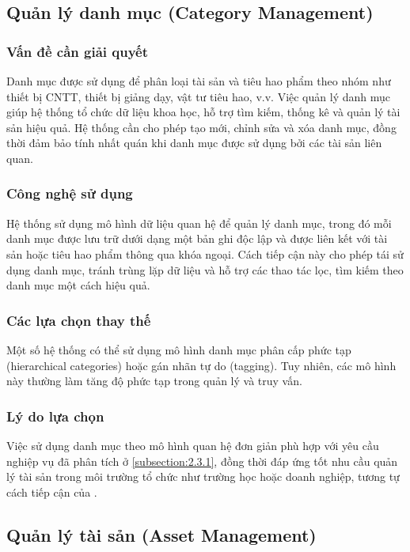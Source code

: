 \documentclass[../DoAn.tex]{subfiles}
\begin{document}
\subsection{Quản lý danh mục (Category Management)}

\subsubsection{Vấn đề cần giải quyết}

Danh mục được sử dụng để phân loại tài sản và tiêu hao phẩm theo nhóm như thiết bị CNTT, thiết bị giảng dạy, vật tư tiêu hao, v.v. Việc quản lý danh mục giúp hệ thống tổ chức dữ liệu khoa học, hỗ trợ tìm kiếm, thống kê và quản lý tài sản hiệu quả. Hệ thống cần cho phép tạo mới, chỉnh sửa và xóa danh mục, đồng thời đảm bảo tính nhất quán khi danh mục được sử dụng bởi các tài sản liên quan.

\subsubsection{Công nghệ sử dụng}

Hệ thống sử dụng mô hình dữ liệu quan hệ để quản lý danh mục, trong đó mỗi danh mục được lưu trữ dưới dạng một bản ghi độc lập và được liên kết với tài sản hoặc tiêu hao phẩm thông qua khóa ngoại. Cách tiếp cận này cho phép tái sử dụng danh mục, tránh trùng lặp dữ liệu và hỗ trợ các thao tác lọc, tìm kiếm theo danh mục một cách hiệu quả.

\subsubsection{Các lựa chọn thay thế}

Một số hệ thống có thể sử dụng mô hình danh mục phân cấp phức tạp (hierarchical categories) hoặc gán nhãn tự do (tagging). Tuy nhiên, các mô hình này thường làm tăng độ phức tạp trong quản lý và truy vấn.

\subsubsection{Lý do lựa chọn}

Việc sử dụng danh mục theo mô hình quan hệ đơn giản phù hợp với yêu cầu nghiệp vụ đã phân tích ở \autoref{subsection:2.3.1}, đồng thời đáp ứng tốt nhu cầu quản lý tài sản trong môi trường tổ chức như trường học hoặc doanh nghiệp, tương tự cách tiếp cận của .

\subsection{Quản lý tài sản (Asset Management)}
\end{document}
